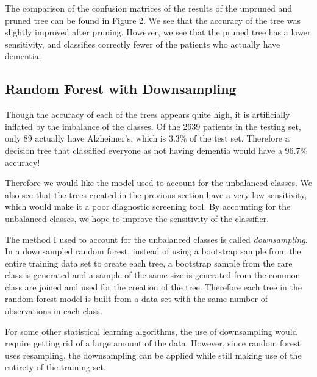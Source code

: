 \documentclass[a4paper,man,natbib,11pt]{article}
\begin{document}
The comparison of the confusion matrices of the results of the unpruned and pruned tree can be found in Figure 2. We see that the accuracy of the tree was slightly improved after pruning. However, we see that the pruned tree has a lower sensitivity, and classifies correctly fewer of the patients who actually have dementia. 

\subsection{Random Forest with Downsampling}

Though the accuracy of each of the trees appears quite high, it is artificially inflated by the imbalance of the classes. Of the 2639 patients in the testing set, only 89 actually have Alzheimer's, which is 3.3\% of the test set. Therefore a decision tree that classified everyone as not having dementia would have a 96.7\% accuracy! 

Therefore we would like the model used to account for the unbalanced classes. We also see that the trees created in the previous section have a very low sensitivity, which would make it a poor diagnostic screening tool. By accounting for the unbalanced classes, we hope to improve the sensitivity of the classifier.

The method I used to account for the unbalanced classes is called \textit{downsampling}. In a downsampled random forest, instead of using a bootstrap sample from the entire training data set to create each tree, a bootstrap sample from the rare class is generated and a sample of the same size is generated from the common class are joined and used for the creation of the tree. Therefore each tree in the random forest model is built from a data set with the same number of observations in each class.

For some other statistical learning algorithms, the use of downsampling would require getting rid of a large amount of the data. However, since random forest uses resampling, the downsampling can be applied while still making use of the entirety of the training set.
\end{document}
